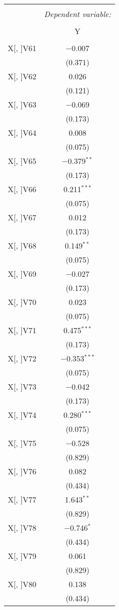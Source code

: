 \documentclass[11pt, a4paper]{article}
\begin{document}
\begin{multicols}{2}
\FloatBarrier
\begin{center}
\begin{tabular}{@{\extracolsep{5pt}}lc} 
\\[-1.8ex]\hline 
\hline \\[-1.8ex] 
 & \multicolumn{1}{c}{\textit{Dependent variable:}} \\ 
\cline{2-2} 
\\[-1.8ex] & Y \\ 
\hline \\[-1.8ex] 
 X[, ]V61 & $-$0.007 \\ 
  & (0.371) \\ 
 X[, ]V62 & 0.026 \\ 
  & (0.121) \\  
 X[, ]V63 & $-$0.069 \\ 
  & (0.173) \\ 
 X[, ]V64 & 0.008 \\ 
  & (0.075) \\  
 X[, ]V65 & $-$0.379$^{**}$ \\ 
  & (0.173) \\  
 X[, ]V66 & 0.211$^{***}$ \\ 
  & (0.075) \\ 
 X[, ]V67 & 0.012 \\ 
  & (0.173) \\ 
 X[, ]V68 & 0.149$^{**}$ \\ 
  & (0.075) \\  
 X[, ]V69 & $-$0.027 \\ 
  & (0.173) \\  
 X[, ]V70 & 0.023 \\ 
  & (0.075) \\  
 X[, ]V71 & 0.475$^{***}$ \\ 
  & (0.173) \\  
 X[, ]V72 & $-$0.353$^{***}$ \\ 
  & (0.075) \\  
 X[, ]V73 & $-$0.042 \\ 
  & (0.173) \\  
 X[, ]V74 & 0.280$^{***}$ \\ 
  & (0.075) \\  
 X[, ]V75 & $-$0.528 \\ 
  & (0.829) \\  
 X[, ]V76 & 0.082 \\ 
  & (0.434) \\  
 X[, ]V77 & 1.643$^{**}$ \\ 
  & (0.829) \\ 
 X[, ]V78 & $-$0.746$^{*}$ \\ 
  & (0.434) \\  
 X[, ]V79 & 0.061 \\ 
  & (0.829) \\  
 X[, ]V80 & 0.138 \\ 
  & (0.434) \\  
\end{tabular} 
\end{center}
\FloatBarrier


\end{multicols}
\end{document}
